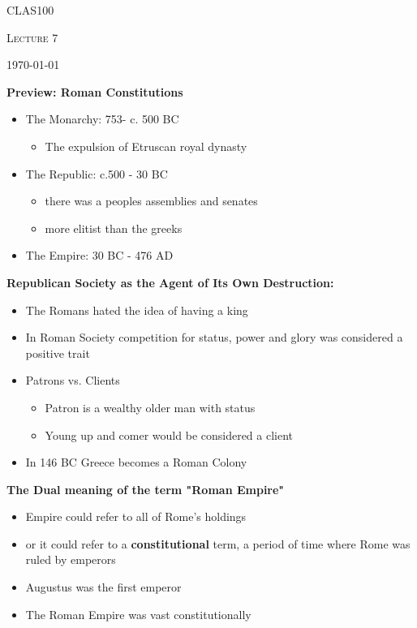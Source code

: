 \documentclass[12pt,a4paper]{report}
\begin{document}
	\centering
	{\scshape\LARGE CLAS100 \par}
	{\scshape\Large Lecture 7\par}
	{\large \today\par}
	\vspace{1.5cm}
	
\textbf{Preview: Roman Constitutions}
\begin{itemize}
\item The Monarchy: 753- c. 500 BC
\begin{itemize}
\item The expulsion of Etruscan royal dynasty
\end{itemize}
\item The Republic: c.500 - 30 BC
\begin{itemize}
\item there was a peoples assemblies and senates
\item more elitist than the greeks
\end{itemize}
\item The Empire: 30 BC - 476 AD
\end{itemize}
\textbf{Republican Society as the Agent of Its Own Destruction:}
\begin{itemize}
\item The Romans hated the idea of having a king
\item In Roman Society competition for status, power and glory was considered a positive trait
\item Patrons vs. Clients
\begin{itemize}
\item Patron is a wealthy older man with status
\item Young up and comer would be considered a client
\end{itemize}
\item In 146 BC Greece becomes a Roman Colony
\end{itemize}
\textbf{The Dual meaning of the term "Roman Empire"}
\begin{itemize}
\item Empire could refer to all of Rome's holdings
\item or it could refer to a \textbf{constitutional} term, a period of time where Rome was ruled by emperors
\item Augustus was the first emperor
\item The Roman Empire was vast constitutionally
\end{itemize}
\end{document}
